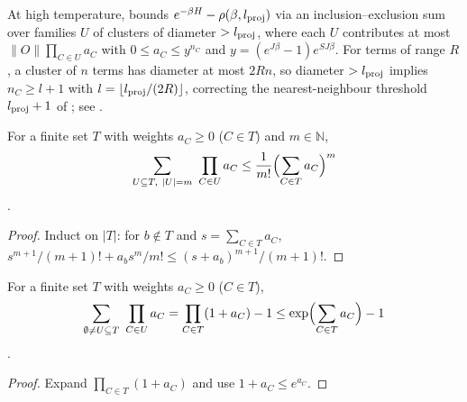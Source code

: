 
At high temperature, \cite[lines 1196--1225]{Hastings2006Solving} bounds
$e^{-\beta H}-\rho(\beta,l_{\rm proj})$ via an inclusion--exclusion sum over
families $U$ of clusters of diameter $>l_{\rm proj}$, where each $U$ contributes
at most $\|O\|\prod_{C\in U}a_C$ with $0\le a_C\le y^{n_C}$ and
$y=(e^{J\beta}-1)e^{SJ\beta}$. For terms of range $R$, a cluster of $n$ terms
has diameter at most $2Rn$, so diameter $>l_{\rm proj}$ implies
$n_C\ge l+1$ with $l=\lfloor l_{\rm proj}/(2R)\rfloor$, correcting the
nearest-neighbour threshold $l_{\rm proj}+1$ of
\cite[line 1240]{Hastings2006Solving}; see
\cite{gap:hastings05_percolation_cluster_size}.

\begin{lemma}
    \label{thm:hastings_percolation_families}
    \leanok
    For a finite set $T$ with weights $a_C\ge0$ ($C\in T$) and $m\in\mathbb N$,
    \begin{align}
        \sum_{U\subseteq T,\ |U|=m}\ \prod_{C\in U}a_C
        \le\frac1{m!}\Bigl(\sum_{C\in T}a_C\Bigr)^m
        \label{eq:hastings_percolation_families}
    \end{align}
    \cite[line 1210]{Hastings2006Solving}.
\end{lemma}
\begin{proof}
    \leanok
    Induct on $|T|$: for $b\notin T$ and $s=\sum_{C\in T}a_C$,
    $s^{m+1}/(m+1)!+a_bs^m/m!\le(s+a_b)^{m+1}/(m+1)!$.
\end{proof}

\begin{lemma}
    \label{thm:hastings_percolation_exp}
    \leanok
    For a finite set $T$ with weights $a_C\ge0$ ($C\in T$),
    \begin{align}
        \sum_{\emptyset\ne U\subseteq T}\ \prod_{C\in U}a_C
        =\prod_{C\in T}(1+a_C)-1
        \le\exp\Bigl(\sum_{C\in T}a_C\Bigr)-1
        \label{eq:hastings_percolation_exp}
    \end{align}
    \cite[lines 1238--1241]{Hastings2006Solving}.
\end{lemma}
\begin{proof}
    \leanok
    Expand $\prod_{C\in T}(1+a_C)$ and use $1+a_C\le e^{a_C}$.
\end{proof}

